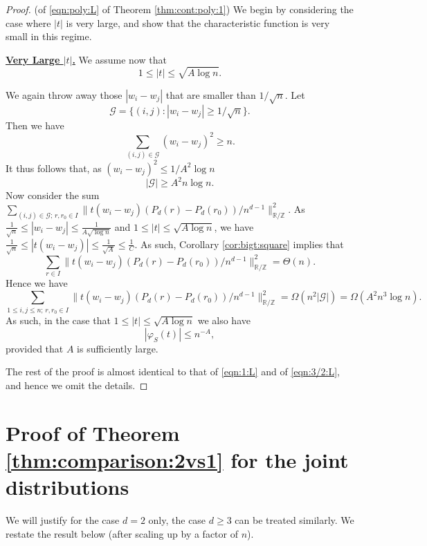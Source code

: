 \documentclass[reqno]{amsart}
\newcommand\R{{\mathbb{R}}}
\newcommand\Z{{\mathbb{Z}}}
\newcommand\CG{{\mathcal G}}
\theoremstyle{plain}
\theoremstyle{definition}
\begin{document}
\begin{proof}(of \eqref{eqn:poly:L} of Theorem \ref{thm:cont:poly:1}) We begin by considering the case where $|t|$ is very large, and show that the characteristic function is very small in this regime.

\underline{\bf Very Large $|t|$.} We assume now that 
$$1 \le |t| \le  \sqrt{A\log n}.$$

We
again throw away those $|w_{i}-w_{j}|$ that are smaller than $1/\sqrt{n}$. 
Let 
$$\CG=\{(i,j): |w_{i}-w_{j}| \ge 1/\sqrt{n}\}.$$
Then we have 
$$\sum_{(i,j)\in \CG} (w_{i}-w_{j})^{2} \ge n.$$
It thus follows that, as $(w_{i}-w_{j})^2 \le 1/A^2\log n$ 
$$|\CG| \ge A^{2} n \log n.$$
Now consider the sum $\sum_{(i,j)\in \CG; \, r,r_{0} \in I} \|t (w_{i}-w_{j}) (P_{d}(r) - P_{d}(r_{0}))/n^{d-1}\|_{\R/\Z}^{2}$. 
As $\frac{1}{\sqrt{n}} \le |w_{i}-w_{j}| \le \frac{1}{A\sqrt{\log n}}$ and $1 \le |t| \le  \sqrt{A\log n}$, we have $\frac{1}{\sqrt{n}}  \le |t(w_{i}-w_{j})| \le \frac{1}{\sqrt{A}}\le \frac{1}{C}$.
As such, Corollary \ref{cor:bigt:square} implies that 
\[
\sum_{r\in I} \|t (w_{i}-w_{j}) (P_{d}(r) - P_{d}(r_{0}))/n^{d-1}\|_{\R/\Z}^{2} = \Theta(n).
\]
Hence we have 
\[
\sum_{1\le i,j\le n; \, r,r_{0} \in I} \|t (w_{i}-w_{j}) (P_{d}(r) - P_{d}(r_{0}))/n^{d-1}\|_{\R/\Z}^{2}  = \Omega(n^{2} |\CG|)= \Omega(A^2n^{3}\log n).
\]
As such, in the case that 
$1\le |t|\le \sqrt{A\log n}$ we also have
\begin{equation}\label{eqn:L:large:t:quad}
|\varphi_{S}(t)| \le n^{-A},
\end{equation}
provided that $A$ is sufficiently large. 

The rest of the proof is almost identical to that of \eqref{eqn:1:L} and of \eqref{eqn:3/2:L}, and hence we omit the details. 
 \end{proof}



\section{Proof of Theorem \ref{thm:comparison:2vs1} for the joint distributions}\label{sect:joint}
We will justify for the case $d=2$ only, the case $d\ge 3$ can be treated similarly. We restate the result below (after scaling up by a factor of $n$).
\end{document}
